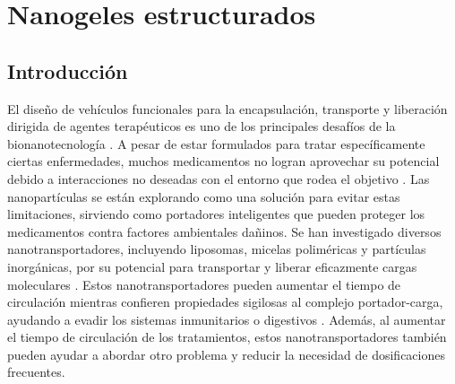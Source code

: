 \chapter{Nanogeles estructurados}
\label{Chapter-esfericas}
\section{Introducci\'on}




El dise\~no de veh\'iculos funcionales para la encapsulaci\'on, transporte y liberaci\'on dirigida de agentes terap\'euticos es uno de los principales desaf\'ios de la bionanotecnolog\'ia \cite{ye2018review}.
A pesar de estar formulados para tratar espec\'ificamente ciertas enfermedades, muchos medicamentos no logran aprovechar su potencial debido a interacciones no deseadas con el entorno que rodea el objetivo \cite{ibraheem2014administration}.
Las nanopart\'iculas se est\'an explorando como una soluci\'on para evitar estas limitaciones, sirviendo como portadores inteligentes que pueden proteger los medicamentos contra factores ambientales da\~ninos.
Se han investigado diversos nanotransportadores, incluyendo liposomas, micelas polim\'ericas y part\'iculas inorg\'anicas, por su potencial para transportar y liberar eficazmente cargas moleculares \cite{chamundeeswari2019nanocarriers, lopez2012organic}.
Estos nanotransportadores pueden aumentar el tiempo de circulaci\'on mientras confieren propiedades sigilosas al complejo portador-carga, ayudando a evadir los sistemas inmunitarios o digestivos \cite{gaucher2010polymeric}.
Adem\'as, al aumentar el tiempo de circulaci\'on de los tratamientos, estos nanotransportadores tambi\'en pueden ayudar a abordar otro problema y reducir la necesidad de dosificaciones frecuentes.


